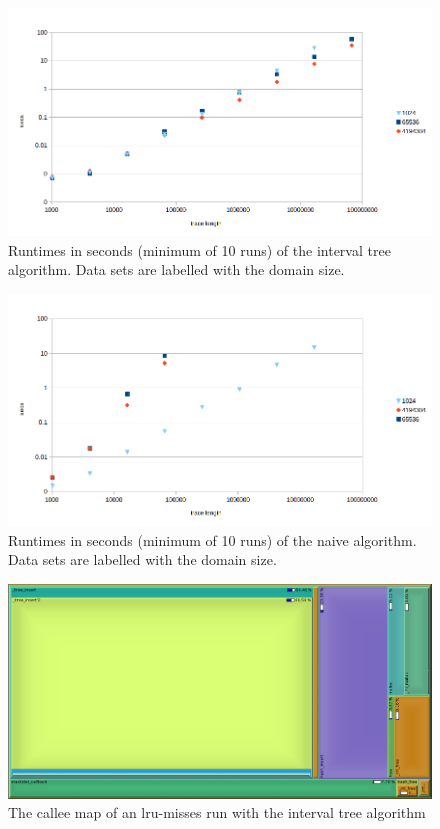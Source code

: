 \documentclass[a4paper,10pt]{article}
\begin{document}
\begin{figure}
\includegraphics[width=\textwidth]{itree}
\caption{Runtimes in seconds (minimum of 10 runs) of the interval tree algorithm.
Data sets are labelled with the domain size.}
\label{fig:resultsplotitree}
\end{figure}

\begin{figure}
\includegraphics[width=\textwidth]{naive}
\caption{Runtimes in seconds (minimum of 10 runs) of the naive algorithm.
Data sets are labelled with the domain size.}
\label{fig:resultsplotnaive}
\end{figure}

\begin{figure}
\includegraphics[width=\textwidth]{calleemap}
\caption{The callee map of an lru-misses run with the interval tree algorithm}
\label{fig:calleemap}
\end{figure}
\end{document}

